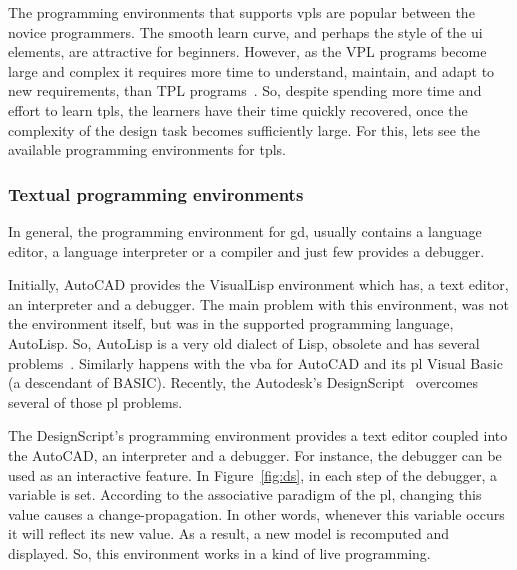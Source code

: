 The programming environments that supports \ac{vpls} are popular between the novice programmers. The smooth learn curve, and perhaps the style of the \ac{ui} elements, are attractive for beginners. However, as the {\small VPL} programs become large and complex it requires more time to understand, maintain, and adapt to new requirements, than {\small TPL} programs~\cite{leitao2011programming}. So, despite spending more time and effort to learn \ac{tpls}, the learners have their time quickly recovered, once the complexity of the design task becomes sufficiently large. For this, lets see the available programming environments for \ac{tpls}.

\subsubsection{Textual programming environments}

In general, the programming environment for \ac{gd}, usually contains a language editor, a language interpreter or a compiler and just few provides a debugger. 

Initially, AutoCAD provides the VisualLisp environment which has, a text editor, an interpreter and a debugger. The main problem with this environment, was not the environment itself, but was in the supported programming language, AutoLisp. So, AutoLisp is a very old dialect of Lisp, obsolete and has several problems~\cite{cabecinhas2010high}. Similarly happens with the \ac{vba} for AutoCAD and its \ac{pl} Visual Basic (a descendant of {\small BASIC}). Recently, the Autodesk's DesignScript~\cite{aish2012designscript} overcomes several of those \ac{pl} problems. 

The DesignScript's programming environment provides a text editor coupled into the AutoCAD, an interpreter and a debugger. For instance, the debugger can be used as an interactive feature. In Figure~\ref{fig:ds}, in each step of the debugger, a variable is set. According to the associative paradigm of the \ac{pl}, changing this value causes a change-propagation. In other words, whenever this variable occurs it will reflect its new value. As a result, a new model is recomputed and displayed. So, this environment works in a kind of live programming.

